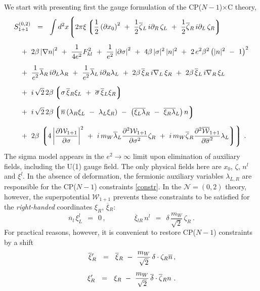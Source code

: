 \documentclass[12pt]{article}
\newcommand{\ntwoo}{${\mathcal N}= \left(0,2\right) $ }
\newcommand{\p}{\partial}
\newcommand{\ov}{\overline}
\newcommand{\mc}[1]{\mathcal{#1}}
\newcommand{\lgr}{\left\lgroup}
\newcommand{\rgr}{\right\rgroup}
\newcommand{\bxir}{\ov{\xi}{}_R}
\newcommand{\xir}{\xi_R}
\newcommand{\bzr}{\ov{\zeta}{}_R}
\newcommand{\nbar}{\ov{n}}
\newcommand{\CPC}{CP($N-1$)$\times$C }
\begin{document}
	We start with presenting first the gauge formulation of the \CPC theory,
\begin{align*}
%
	& S_{1+1}^{(0,2)} ~~=~~ \int d^2 x 
\Biggl \lgroup
	2\pi\xi \lgr \frac 1 2 \left (\p x_0\right)^2 ~+~
		      \frac 1 2 \ov{\zeta}{}_L\, i\p_R\, \zeta_L ~+~
			\frac 1 2 \ov {\zeta}{}_R\, i\p_L\, \zeta_R
		\rgr
	 \\[2mm]
%
&
	\;\;
	~+~
	2\beta \left| \nabla n \right|^2 ~+~ \frac{1}{4e^2} F_{kl}^2
			~+~ \frac{1}{e^2} \left|\p \sigma\right|^2 ~+~
	4\beta\, |\sigma|^2\, |n|^2 ~+~
	2\, e^2\beta^2 \left( |n|^2 ~-~ 1 \right)^2 \\[2mm]
%
&
	\;\;
	~+~
	\frac{1}{e^2} \ov{\lambda}{}_R\, i\p_L \lambda_R ~+~
	\frac{1}{e^2} \ov{\lambda}{}_L\, i\p_R \lambda_L ~+~
	2\beta\, \ov{\xi}{}_R\, i\nabla_L\, \xi_R ~+~
	2\beta\, \ov{\xi}{}_L\, i\nabla_R\, \xi_L  \\[2mm]
%
&
	\;\;
	~+~
	i\,\sqrt{2}\,2\beta \lgr \sigma\, \ov{\xi}{}_R\xi_L ~+~ 
				\ov{\sigma}\,\ov{\xi}{}_L\xi_R \rgr  \\[2mm]
%
&
	\;\;
	~+~
	i\,\sqrt{2}\,2\beta 
		\lgr \ov{n} \left( \lambda_R \xi_L ~-~ \lambda_L\xi_R \right)
		~-~ \left( \ov{\xi_L\lambda}{}_R ~-~ \ov{\xi_R\lambda}{}_L \right) n \rgr 
	\\[2mm]
%
&	
	\;\;
	~+~
	2\beta\,
	\lgr 4 \left | \frac{\p \mc{W}_{1+1}}{\p\sigma} \right |^2 
		~+~ i\, m_W \ov{\lambda}_L \frac{\p^2 \mc{W}_{1+1}}{\p \sigma^2} \zeta_R 
	~+~ i\, m_W \ov{\zeta}{}_R \frac{\p^2 \ov{\mc{W}}{}_{1+1}}{\p\ov{\sigma}^2} \lambda_L 
	\rgr
	\Biggr \rgroup~.
\label{cpgf}
\end{align*}
	The sigma model appears in the $ e^2 \to \infty $ limit upon elimination of  auxiliary fields, 
	including the U(1) gauge field.
	The only physical fields here are $ x_0 $, $ \zeta $, $ n^l $ and $ \xi^l $.
	In the absence of deformation, the fermionic auxiliary variables $ \lambda_{L,R} $  are responsible for 
	the CP($N-1$) constraints \eqref{constr}.
	In the \ntwoo theory, however, the superpotential $ \mathcal{W}_{1+1} $ prevents these constraints to be satisfied
	 for the {\it right-handed} coordinates $ \xir $, $ \bxir $:
\[
	\nbar{}_l\, \xi_L^l ~~=~~ 0\,, \qquad\qquad  
	\ov{\xi}{}_{lR}\, n^l ~~=~~ \delta\, \frac{m_W}{\sqrt{2}}\, \zeta_R~.
\]
	For practical reasons, however, it is convenient to restore CP($N-1$) constraints by a shift
\begin{align}
%
\notag
	\bxir' ~~=~~ \bxir ~-~ \frac{m_W}{\sqrt{2}}\, \delta \cdot \zeta_R\ov{n} \,,\\[2mm]
%
\label{shift}
	\xi_R' ~~=~~ \xi_R ~-~ \frac{m_W}{\sqrt{2}}\, \ov{\delta} \cdot \bzr n~.
\end{align}
\end{document}
